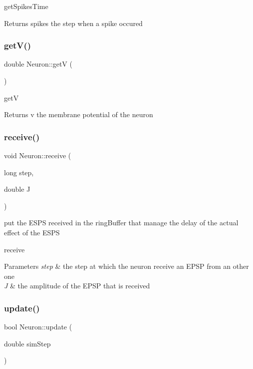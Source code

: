 get\+Spikes\+Time \begin{DoxyReturn}{Returns}
spikes the step when a spike occured 
\end{DoxyReturn}
\mbox{\label{class_neuron_ad3d6daf9c6c1aa35dc55afb362d74a55}} 
\subsubsection{\texorpdfstring{get\+V()}{getV()}}
{\footnotesize\ttfamily double Neuron\+::getV (\begin{DoxyParamCaption}{ }\end{DoxyParamCaption})}

getV \begin{DoxyReturn}{Returns}
v the membrane potential of the neuron 
\end{DoxyReturn}
\mbox{\label{class_neuron_a39df21c3ca040d88bc50f87f3af0ed35}} 
\subsubsection{\texorpdfstring{receive()}{receive()}}
{\footnotesize\ttfamily void Neuron\+::receive (\begin{DoxyParamCaption}\item[{long}]{step,  }\item[{double}]{J }\end{DoxyParamCaption})}



put the E\+S\+PS received in the ring\+Buffer that manage the delay of the actual effect of the E\+S\+PS 

receive 
\begin{DoxyParams}{Parameters}
{\em step} & the step at which the neuron receive an E\+P\+SP from an other one \\
\hline
{\em J} & the amplitude of the E\+P\+SP that is received \\
\hline
\end{DoxyParams}
\mbox{\label{class_neuron_a28f735ec9735d7a41306a517307bf69f}} 
\subsubsection{\texorpdfstring{update()}{update()}}
{\footnotesize\ttfamily bool Neuron\+::update (\begin{DoxyParamCaption}\item[{double}]{sim\+Step }\end{DoxyParamCaption})}

